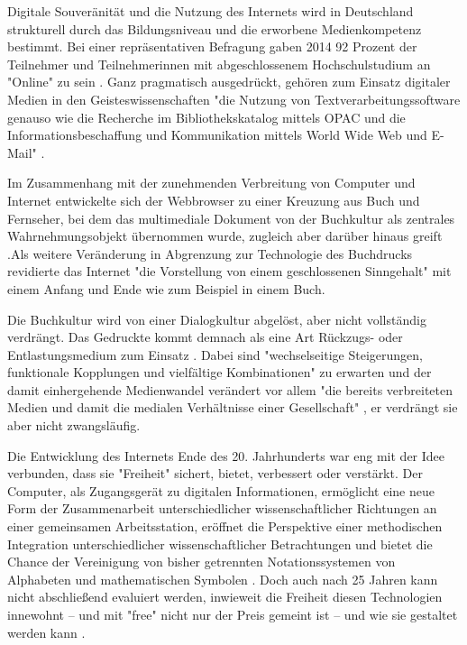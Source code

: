Digitale Souveränität und die Nutzung des Internets wird in Deutschland strukturell durch das Bildungsniveau und die erworbene Medienkompetenz bestimmt. Bei einer repräsentativen Befragung gaben 2014 92 Prozent der Teilnehmer und Teilnehmerinnen mit abgeschlossenem Hochschulstudium an "Online" zu sein \cite{nonliner_2014}. Ganz pragmatisch ausgedrückt, gehören zum Einsatz digitaler Medien in den Geisteswissenschaften "die Nutzung von Textverarbeitungssoftware genauso wie die Recherche im Bibliothekskatalog mittels OPAC und die Informationsbeschaffung und Kommunikation mittels World Wide Web und E-Mail" \cite{naeder_2010_open}.

Im Zusammenhang mit der zunehmenden Verbreitung von Computer und Internet entwickelte sich der Webbrowser zu einer Kreuzung aus Buch und Fernseher, bei dem das multimediale Dokument von der Buchkultur als zentrales Wahrnehmungsobjekt übernommen wurde, zugleich aber darüber hinaus greift \cite{Warnke_2011}.Als weitere Veränderung in Abgrenzung zur Technologie des Buchdrucks revidierte das Internet "die Vorstellung von einem geschlossenen Sinngehalt" \cite{sandbothe_2000_pragmatische} mit einem Anfang und Ende wie zum Beispiel in einem Buch.

Die Buchkultur wird von einer Dialogkultur abgelöst, aber nicht vollständig verdrängt. Das Gedruckte kommt demnach als eine Art Rückzugs- oder Entlastungsmedium zum Einsatz \cite{hagner_2015_sache_buches}. Dabei sind "wechselseitige Steigerungen, funktionale Kopplungen und vielfältige Kombinationen" zu erwarten und der damit einhergehende Medienwandel verändert vor allem "die bereits verbreiteten Medien und damit die medialen Verhältnisse einer Gesellschaft" \cite{Koenen_1997}, er verdrängt sie aber nicht zwangsläufig.

Die Entwicklung des Internets Ende des 20. Jahrhunderts war eng mit der Idee verbunden, dass sie "Freiheit" sichert, bietet, verbessert oder verstärkt. Der Computer, als Zugangsgerät zu digitalen Informationen, ermöglicht eine neue Form der Zusammenarbeit unterschiedlicher wissenschaftlicher Richtungen an einer gemeinsamen Arbeitsstation, eröffnet die Perspektive einer methodischen Integration unterschiedlicher wissenschaftlicher Betrachtungen und bietet die Chance der Vereinigung von bisher getrennten Notationssystemen von Alphabeten und mathematischen Symbolen \cite{kittler_2004}. Doch auch nach 25 Jahren kann nicht abschließend evaluiert werden, inwieweit die Freiheit diesen Technologien innewohnt – und mit "free" nicht nur der Preis gemeint ist  \cite{stallman2002} – und wie sie gestaltet werden kann \cite{kelty_2014_freedom}.

